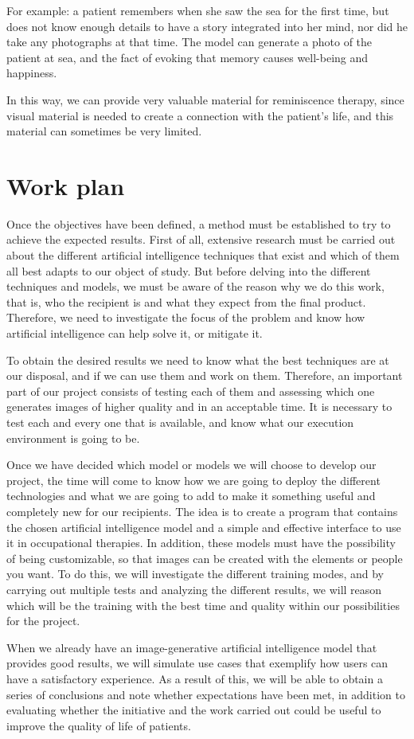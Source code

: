 For example: a patient remembers when she saw the sea for the first time, but does not know enough details to have a story integrated into her mind, nor did he take any photographs at that time. The model can generate a photo of the patient at sea, and the fact of evoking that memory causes well-being and happiness.

In this way, we can provide very valuable material for reminiscence therapy, since visual material is needed to create a connection with the patient's life, and this material can sometimes be very limited.


\section{Work plan}

Once the objectives have been defined, a method must be established to try to achieve the expected results. First of all, extensive research must be carried out about the different artificial intelligence techniques that exist and which of them all best adapts to our object of study. But before delving into the different techniques and models, we must be aware of the reason why we do this work, that is, who the recipient is and what they expect from the final product. Therefore, we need to investigate the focus of the problem and know how artificial intelligence can help solve it, or mitigate it. 

To obtain the desired results we need to know what the best techniques are at our disposal, and if we can use them and work on them. Therefore, an important part of our project consists of testing each of them and assessing which one generates images of higher quality and in an acceptable time. It is necessary to test each and every one that is available, and know what our execution environment is going to be.

Once we have decided which model or models we will choose to develop our project, the time will come to know how we are going to deploy the different technologies and what we are going to add to make it something useful and completely new for our recipients. The idea is to create a program that contains the chosen artificial intelligence model and a simple and effective interface to use it in occupational therapies. In addition, these models must have the possibility of being customizable, so that images can be created with the elements or people you want. To do this, we will investigate the different training modes, and by carrying out multiple tests and analyzing the different results, we will reason which will be the training with the best time and quality within our possibilities for the project.

When we already have an image-generative artificial intelligence model that provides good results, we will simulate use cases that exemplify how users can have a satisfactory experience. As a result of this, we will be able to obtain a series of conclusions and note whether expectations have been met, in addition to evaluating whether the initiative and the work carried out could be useful to improve the quality of life of patients.